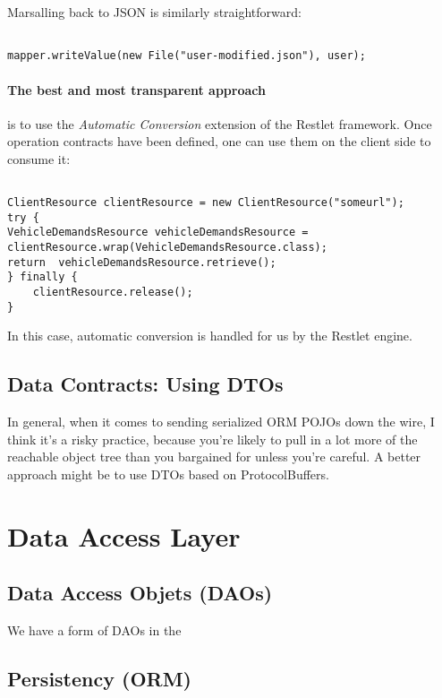 \documentclass[12pt]{scrartcl}
\begin{document}
Marsalling back to JSON is similarly straightforward:

\begin{lstlisting}

mapper.writeValue(new File("user-modified.json"), user);

\end{lstlisting}

\paragraph{The best and most transparent approach} is to use the \emph{Automatic Conversion} extension of the Restlet framework. Once operation contracts have been defined, one can use them on the client side to consume it:

\begin{lstlisting}

ClientResource clientResource = new ClientResource("someurl");
try {
VehicleDemandsResource vehicleDemandsResource = clientResource.wrap(VehicleDemandsResource.class);
return  vehicleDemandsResource.retrieve();
} finally {
    clientResource.release();
}

\end{lstlisting}

In this case, automatic conversion is handled for us by the Restlet engine.

\subsection{Data Contracts: Using DTOs}

In general, when it comes to sending serialized ORM POJOs down the wire, I think it's a risky practice, because you're likely to pull in a lot more of the reachable object tree than you bargained for unless you're careful. A better approach might be to use DTOs based on ProtocolBuffers.

\section{Data Access Layer}

\subsection{Data Access Objets (DAOs)}

We have a form of DAOs in the

\subsection{Persistency (ORM)}
\end{document}
